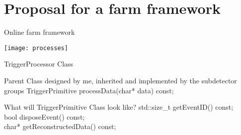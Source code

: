 \section{Proposal for a farm framework}
\begin{frame}{Online farm framework}{}
	\begin{center}
	  \texttt{[image: processes]}
	\end{center}
\end{frame}

\begin{frame}{TriggerProcessor Class}{}
	\begin{exampleblock}{Parent Class designed by me, inherited and implemented by the
	subdetector groups}
	TriggerPrimitive processData(char* data) const;
	\end{exampleblock}
	
	\begin{block}{What will TriggerPrimitive Class look like?}
		std::size\_t getEventID() const; \\
		bool disposeEvent() const; \\
		char* getReconstructedData() const;
	\end{block}
	
\end{frame}